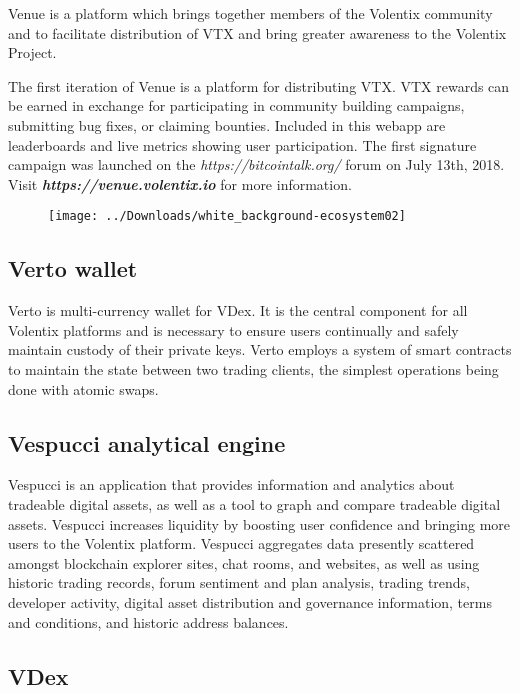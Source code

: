 \documentclass[]{article}
\begin{document}
Venue is a platform which brings together members of the Volentix community 
and to facilitate distribution of VTX and bring greater awareness to the Volentix Project. 

The first iteration of Venue is a platform for distributing VTX. 
VTX rewards can be earned in exchange for participating in community building campaigns, submitting bug fixes, or claiming bounties. 
Included in this webapp are leaderboards and live metrics showing user participation. 
The first signature campaign was launched on the \textit{https://bitcointalk.org/} forum on July 13th, 2018. 
Visit \textbf{\textit{https://venue.volentix.io}} for more information. 
	
\begin{figure}
	\centering
	\texttt{[image: ../Downloads/white\_background-ecosystem02]}
	\caption{}
	\label{fig:whitebackground-ecosystem02}
\end{figure}



\subsection {Verto wallet}
Verto is multi-currency wallet for VDex. 
It is the central component for all Volentix platforms and is necessary to ensure users continually and safely maintain custody of their private keys.
Verto employs a system of smart contracts to maintain the state between two trading clients, the simplest operations being done with atomic swaps. 

\subsection {Vespucci analytical engine}
Vespucci is an application that provides information and analytics about tradeable digital assets, 
as well as a tool to graph and compare tradeable digital assets. 
Vespucci increases liquidity by boosting user confidence and bringing more users to the Volentix platform.
Vespucci aggregates data presently scattered amongst blockchain explorer sites, chat rooms, and websites, 
as well as using historic trading records, forum sentiment and plan analysis, trading trends, developer activity,
digital asset distribution and governance information, terms and conditions, and historic address balances.




\subsection {VDex}
\end{document}
